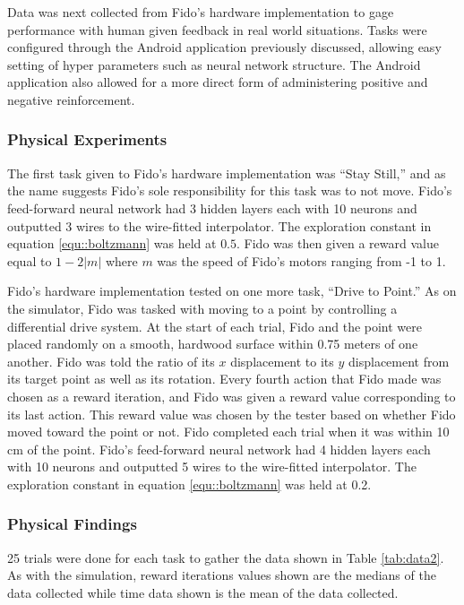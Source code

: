 Data was next collected from Fido's hardware implementation to gage performance with human given feedback in real world situations.
 Tasks were configured through the Android application previously discussed, allowing easy setting of hyper parameters such as neural network structure.
 The Android application also allowed for a more direct form of administering positive and negative reinforcement.


\subsubsection{Physical Experiments}

The first task given to Fido's hardware implementation was ``Stay Still,'' and as the name suggests Fido's sole responsibility for this task was to not move.
Fido's feed-forward neural network had 3 hidden layers each with 10 neurons and outputted 3 wires to the wire-fitted interpolator.
The exploration constant in equation \ref{equ::boltzmann} was held at $0.5$.
Fido was then given a reward value equal to $1 - 2|m|$ where $m$ was the speed of Fido's motors ranging from -1 to 1.

Fido's hardware implementation tested on one more task, ``Drive to Point.'' As on the simulator, Fido was tasked with moving to a point by controlling a differential drive system.
  At the start of each trial, Fido and the point were placed randomly on a smooth, hardwood surface within 0.75 meters of one another.
Fido was told the ratio of its $x$ displacement to its $y$ displacement from its target point as well as its rotation.
Every fourth action that Fido made was chosen as a reward iteration, and Fido was given a reward value corresponding to its last action.
This reward value was chosen by the tester based on whether Fido moved toward the point or not.
Fido completed each trial when it was within 10 cm of the point.
Fido's feed-forward neural network had 4 hidden layers each with 10 neurons and outputted 5 wires to the wire-fitted interpolator.
The exploration constant in equation \ref{equ::boltzmann} was held at 0.2.

\subsubsection{Physical Findings}

25 trials were done for each task to gather the data shown in Table \ref{tab:data2}.
 As with the simulation, reward iterations values shown are the medians of the data collected while time data shown is the mean of the data collected.


